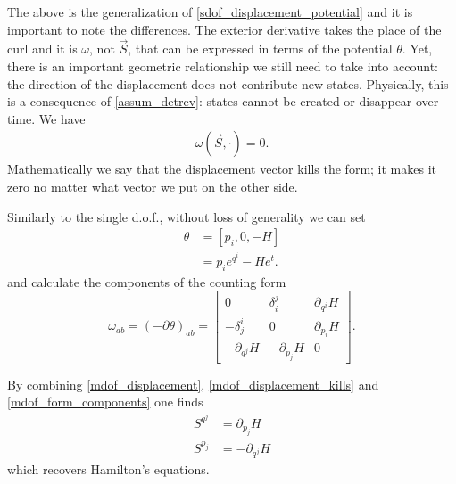 \documentclass[fleqn,10pt]{wlscirep}
\begin{document}
The above is the generalization of \ref{sdof_displacement_potential} and it is important to note the differences. The exterior derivative takes the place of the curl and it is $\omega$, not $\vec{S}$, that can be expressed in terms of the potential $\theta$. Yet, there is an important geometric relationship we still need to take into account: the direction of the displacement does not contribute new states. Physically, this is a consequence of \ref{assum_detrev}: states cannot be created or disappear over time. We have
\begin{align}\label{mdof_displacement_kills}
	\omega(\vec{S}, \cdot) = 0.
\end{align}
Mathematically we say that the displacement vector kills the form; it makes it zero no matter what vector we put on the other side.

Similarly to the single d.o.f., without loss of generality we can set
\begin{equation}\label{mdof_potential_expression}
\begin{aligned}
	\theta &= [p_i, 0, -H] \\
	&= p_i e^{q^i} - H e^t.
\end{aligned}
\end{equation}
and calculate the components of the counting form
\begin{equation}\label{mdof_form_components}
	\omega_{ab} = (-\partial\theta)_{ab} = \begin{bmatrix}
		0 & \delta^j_i & \partial_{q^i} H \\
		-\delta^i_j & 0 & \partial_{p_i} H \\
		-\partial_{q^j} H & -\partial_{p_j} H & 0
	\end{bmatrix}.
\end{equation}

By combining \ref{mdof_displacement}, \ref{mdof_displacement_kills} and \ref{mdof_form_components} one finds
\begin{equation}\label{mdof_Ham_eq}
\begin{aligned}
	S^{q^j} &= \partial_{p_j} H \\
	S^{p_j} &= - \partial_{q^j} H
\end{aligned}
\end{equation}
which recovers Hamilton's equations.
\end{document}
